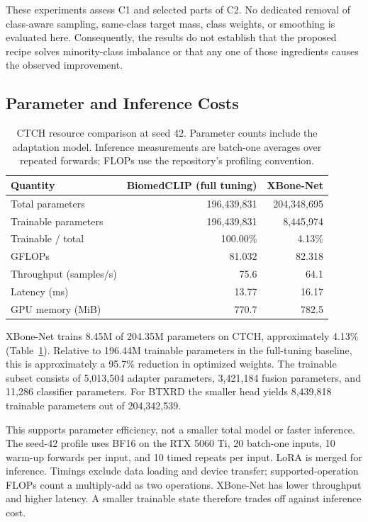 \documentclass{llncs}
\begin{document}
These experiments assess C1 and selected parts of C2. No dedicated removal of class-aware sampling, same-class target mass, class weights, or smoothing is evaluated here. Consequently, the results do not establish that the proposed recipe solves minority-class imbalance or that any one of those ingredients causes the observed improvement.

\subsection{Parameter and Inference Costs}
\begin{table}[t]
\caption{CTCH resource comparison at seed 42. Parameter counts include the adaptation model. Inference measurements are batch-one averages over repeated forwards; FLOPs use the repository's profiling convention.}
\label{tab:resources}
\centering\small
\begin{tabular}{@{}lrr@{}}
\toprule
Quantity & BiomedCLIP (full tuning) & XBone-Net \\
\midrule
Total parameters & 196,439,831 & 204,348,695 \\
Trainable parameters & 196,439,831 & 8,445,974 \\
Trainable / total & 100.00\% & 4.13\% \\
GFLOPs & 81.032 & 82.318 \\
Throughput (samples/s) & 75.6 & 64.1 \\
Latency (ms) & 13.77 & 16.17 \\
GPU memory (MiB) & 770.7 & 782.5 \\
\bottomrule
\end{tabular}
\end{table}

XBone-Net trains 8.45M of 204.35M parameters on CTCH, approximately 4.13\% (Table~\ref{tab:resources}). Relative to 196.44M trainable parameters in the full-tuning baseline, this is approximately a 95.7\% reduction in optimized weights. The trainable subset consists of 5,013,504 adapter parameters, 3,421,184 fusion parameters, and 11,286 classifier parameters. For BTXRD the smaller head yields 8,439,818 trainable parameters out of 204,342,539.

This supports parameter efficiency, not a smaller total model or faster inference. The seed-42 profile uses BF16 on the RTX 5060 Ti, 20 batch-one inputs, 10 warm-up forwards per input, and 10 timed repeats per input. LoRA is merged for inference. Timings exclude data loading and device transfer; supported-operation FLOPs count a multiply-add as two operations. XBone-Net has lower throughput and higher latency. A smaller trainable state therefore trades off against inference cost.
\end{document}
